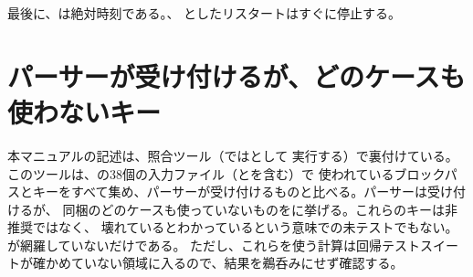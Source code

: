 最後に、は絶対時刻である。、
としたリスタートはすぐに停止する。

\section{パーサーが受け付けるが、どのケースも使わないキー}
\label{sec:ref-numerics:unused}

本マニュアルの記述は、照合ツール（ではとして
実行する）で裏付けている。このツールは、の38個の入力ファイル（とを含む）で
使われているブロックパスとキーをすべて集め、パーサーが受け付けるものと比べる。パーサーは受け付けるが、
同梱のどのケースも使っていないものをに挙げる。これらのキーは非推奨ではなく、
壊れているとわかっているという意味での未テストでもない。が網羅していないだけである。
ただし、これらを使う計算は回帰テストスイートが確かめていない領域に入るので、結果を鵜呑みにせず確認する。

